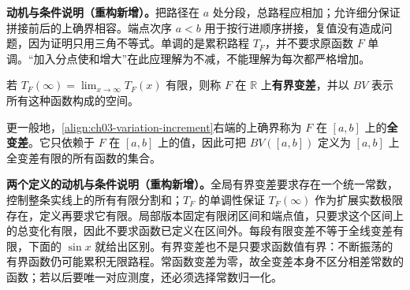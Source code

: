 \documentclass[../../main.tex]{subfiles}%
\begin{document}
\begin{remark}
\textbf{动机与条件说明（重构新增）。}把路径在 $a$ 处分段，总路程应相加；允许细分保证拼接前后的上确界相容。端点次序 $a<b$ 用于按行进顺序拼接，复值没有造成问题，因为证明只用三角不等式。单调的是累积路程 $T_F$，并不要求原函数 $F$ 单调。“加入分点使和增大”在此应理解为不减，不能理解为每次都严格增加。
\end{remark}

\begin{definition}[有界变差]\label{definition:ch03-bv-definition}
若 $T_F(\infty)=\lim_{x\to\infty}T_F(x)$ 有限，则称 $F$ 在 $\mathbb R$ 上\textbf{有界变差}，并以 $BV$ 表示所有这种函数构成的空间。
\end{definition}
\begin{definition}[区间上的全变差与有界变差]\label{definition:ch03-local-bv-definition}
更一般地，\cref{align:ch03-variation-increment}右端的上确界称为 $F$ 在 $[a,b]$ 上的\textbf{全变差}。它只依赖于 $F$ 在 $[a,b]$ 上的值，因此可把 $BV([a,b])$ 定义为 $[a,b]$ 上全变差有限的所有函数的集合。
\end{definition}
\begin{remark}
\textbf{两个定义的动机与条件说明（重构新增）。}全局有界变差要求存在一个统一常数，控制整条实线上的所有有限分割和；$T_F$ 的单调性保证 $T_F(\infty)$ 作为扩展实数极限存在，定义再要求它有限。局部版本固定有限闭区间和端点值，只要求这个区间上的总变化有限，因此不要求函数已定义在区间外。每段有限变差不等于全线变差有限，下面的 $\sin x$ 就给出区别。有界变差也不是只要求函数值有界：不断振荡的有界函数仍可能累积无限路程。常函数变差为零，故全变差本身不区分相差常数的函数；若以后要唯一对应测度，还必须选择常数归一化。
\end{remark}
\end{document}
